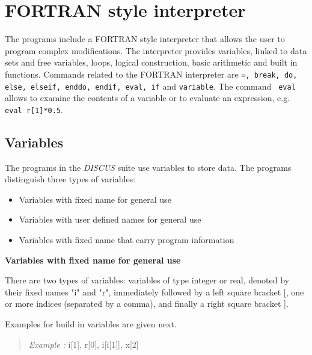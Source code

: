 
\chapter{FORTRAN style interpreter \label{fort}}

The programs include a FORTRAN style interpreter that allows the
user to program complex modifications.  The interpreter provides
variables, linked to data sets and free variables, loops, logical
construction, basic arithmetic and built in functions.  Commands
related to the FORTRAN interpreter are {\tt =, break, do, else,
elseif, enddo, endif, eval, if} and {\tt variable}. The command {\tt
eval} allows to examine the contents of a variable or to evaluate an
expression, e.g. {\tt eval r[1]*0.5}. \par


\section{Variables \label{var}}

The programs in the {\it DISCUS} suite use variables to store 
data. The programs distinguish three types of variables:
\begin{itemize}
  \item Variables with fixed name for general use
  \item Variables with user defined names for general use
  \item Variables with fixed name that carry program information
\end{itemize}

{\bf Variables with fixed name for general use}

There are two types of variables: variables of type integer or real, 
denoted by their fixed names "i" and "r", immediately followed by a left square bracket [, 
one or more indices (separated by a comma), and finally a right square bracket ]. 

Examples for build in variables are given next.

\begin{quote}
  {\it Example :\/} i[1], r[0], i[i[1]], x[2]
\end{quote}

